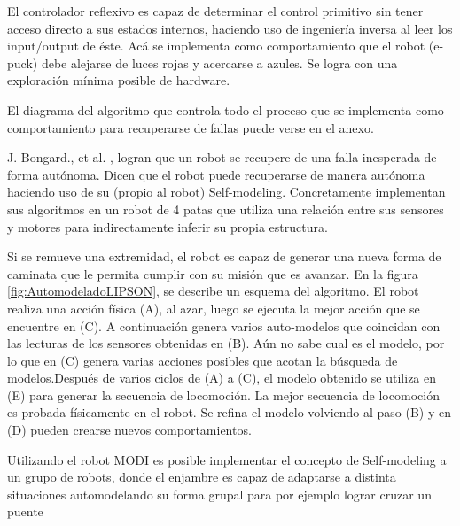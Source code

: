 El controlador reflexivo es capaz de determinar el control primitivo sin tener acceso directo a sus estados internos, haciendo uso de ingeniería inversa al leer los input/output de éste. Acá se implementa como comportamiento que el robot (e-puck) debe alejarse de luces rojas y acercarse a azules. Se logra con una exploración mínima posible de hardware.

El diagrama del algoritmo que controla todo el proceso que se implementa como comportamiento para recuperarse de fallas puede verse en el anexo.

J. Bongard., et al. \cite{Bongard17112006}, logran que un robot se recupere de una falla inesperada de forma autónoma. Dicen que el robot puede recuperarse de manera autónoma haciendo uso de su (propio al robot) Self-modeling. Concretamente implementan sus algoritmos en un robot de 4 patas que utiliza una relación entre sus sensores y motores para indirectamente inferir su propia estructura.


Si se remueve una extremidad, el robot es capaz de generar una nueva forma de caminata que le permita cumplir con su misión que es avanzar.
En la figura \ref{fig:AutomodeladoLIPSON}, se describe un esquema del algoritmo. El robot realiza una acción física (A), al azar, luego se ejecuta la mejor acción que se encuentre en (C). A continuación genera varios auto-modelos que coincidan con las lecturas de los sensores obtenidas en (B). Aún no sabe cual es el modelo, por lo que en (C) genera varias acciones posibles que acotan la búsqueda de modelos.Después de varios ciclos de (A) a (C),  el modelo obtenido se utiliza en (E) para generar la secuencia de locomoción. La mejor secuencia de locomoción es probada físicamente en el robot. Se refina el modelo volviendo al paso (B) y en (D) pueden crearse nuevos comportamientos.

Utilizando el robot MODI es posible implementar el concepto de Self-modeling a un grupo de robots, donde el enjambre es capaz de adaptarse a distinta situaciones automodelando su forma grupal para por ejemplo lograr cruzar un puente 

